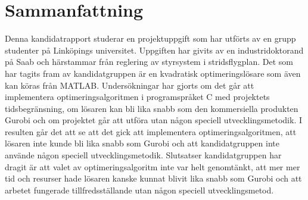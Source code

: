 \section{Sammanfattning}
Denna kandidatrapport studerar en projektuppgift som har utförts av en grupp studenter på Linköpings universitet. Uppgiften har givits av en industridoktorand på Saab och härstammar från reglering av styrsystem i stridsflygplan. Det som har tagits fram av kandidatgruppen är en  kvadratisk optimeringslösare som även kan köras från MATLAB. Undersökningar har gjorts om det går att implementera optimeringsalgoritmen i programspråket C med projektets tidsbegränsning, om lösaren kan bli lika snabb som den kommersiella produkten Gurobi och om projektet går att utföra utan någon speciell utvecklingsmetodik. I resulten går det att se att det gick att implementera optimeringsalgoritmen, att lösaren inte kunde bli lika snabb som Gurobi och att kandidatgruppen inte använde någon speciell utvecklingsmetodik. Slutsatser kandidatgruppen har dragit är att valet av optimeringsalgoritm inte var helt genomtänkt, att mer mer tid och resurser hade lösaren kanske kunnat blivit lika snabb som Gurobi och att arbetet fungerade tillfredsställande utan någon speciell utvecklingsmetod.     